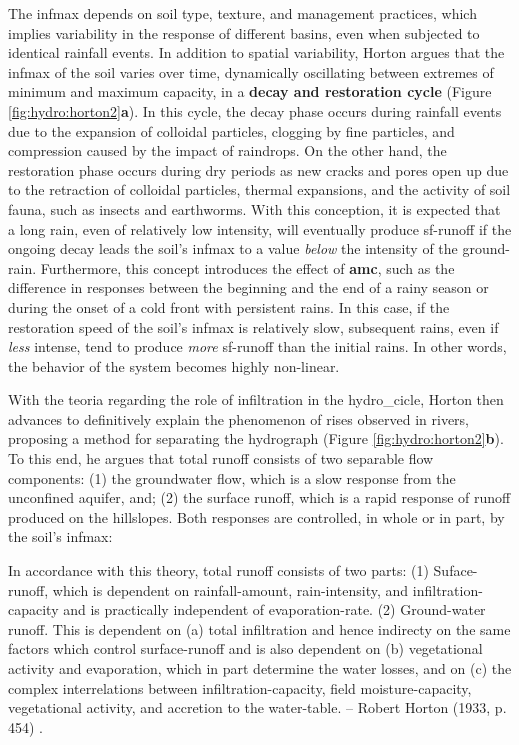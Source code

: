 \documentclass[./main_en.tex]{subfiles}
\begin{document}
\par The \gls{infmax} depends on soil type, texture, and management practices, which implies variability in the response of different basins, even when subjected to identical rainfall events. In addition to spatial variability, Horton argues that the \gls{infmax} of the soil varies over time, dynamically oscillating between extremes of minimum and maximum capacity, in a \textbf{decay and restoration cycle} (Figure \ref{fig:hydro:horton2}\textbf{a}). In this cycle, the decay phase occurs during rainfall events due to the expansion of colloidal particles, clogging by fine particles, and compression caused by the impact of raindrops. On the other hand, the restoration phase occurs during dry periods as new cracks and pores open up due to the retraction of colloidal particles, thermal expansions, and the activity of soil fauna, such as insects and earthworms. With this conception, it is expected that a long rain, even of relatively low intensity, will eventually produce \gls{sf-runoff} if the ongoing decay leads the soil’s \gls{infmax} to a value \textit{below} the intensity of the \gls{ground-rain}. Furthermore, this concept introduces the effect of \textbf{\gls{amc}}, such as the difference in responses between the beginning and the end of a rainy season or during the onset of a cold front with persistent rains. In this case, if the restoration speed of the soil’s \gls{infmax} is relatively slow, subsequent rains, even if \textit{less} intense, tend to produce \textit{more} \gls{sf-runoff} than the initial rains. In other words, the behavior of the \gls{system} becomes highly non-linear.

\par With the \gls{teoria} regarding the role of infiltration in the \gls{hydro_cicle}, Horton then advances to definitively explain the phenomenon of rises observed in rivers, proposing a method for separating the hydrograph (Figure \ref{fig:hydro:horton2}\textbf{b}). To this end, he argues that total runoff consists of two separable flow components: (1) the groundwater flow, which is a slow response from the unconfined aquifer, and; (2) the surface runoff, which is a rapid response of runoff produced on the hillslopes. Both responses are controlled, in whole or in part, by the soil’s \gls{infmax}:

\begin{adjustwidth}{100pt}{0pt}
\medskip
\small In accordance with this theory, total runoff consists of two parts: (1) Suface-runoff, which is dependent on rainfall-amount, rain-intensity, and infiltration-capacity and is practically independent of evaporation-rate. (2) Ground-water runoff. This is dependent on (a) total infiltration and hence indirecty on the same factors which control surface-runoff and is also dependent on (b) vegetational activity and evaporation, which in part determine the water losses, and on (c) the complex interrelations between infiltration-capacity, field moisture-capacity, vegetational activity, and accretion to the water-table. -- Robert Horton (1933, p. 454) \cite{Horton1933}.
\medskip
\end{adjustwidth}
\end{document}
